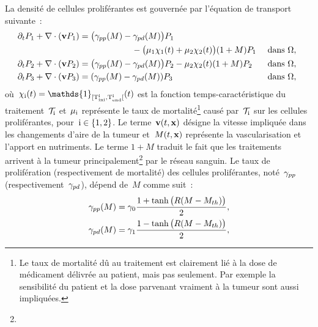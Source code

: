 \documentclass[main.tex]{subfiles}
\begin{document}
La densité de cellules proliférantes est gouvernée par l'équation de transport suivante~:
\begin{align}
\mkern-8mu \partial_t P_1 & + \dive(\vit P_1) = \big(\gammapp(M)- \gammapd(M)\big)P_1 \nonumber \\
 & \hspace{4cm}  - \big(\muI \chiI (t)+\muS \chiS(t) \big)(1+M)P_1 & \textrm{ dans } \Omega, \label{eq_P1}\\
\mkern-8mu \partial_t P_2 &+ \dive(\vit P_2) = \big(\gammapp(M)- \gammapd(M)\big)P_2 - \muS \chiS(t) (1+M)P_2 & \textrm{ dans }  \Omega, \label{eq_P2}\\
\mkern-8mu \partial_t P_3 &+ \dive(\vit P_3) = (\gammapp(M) - \gammapd(M))P_3 & \textrm{ dans }  \Omega, \label{eq_P3}
\end{align}%
où~$\chii(t)=\mathds{1}_{[\Tini{i},\rm \Tend{i}[}(t)$ est la fonction temps-caractéristique du 
traitement~$\mathcal{T}_{\rm i}$ et~$\mu_{\rm i}$ représente le taux de mortalité\footnote{Le taux de mortalité dû au traitement est clairement lié à la dose de médicament délivrée au patient, mais pas seulement. Par exemple la sensibilité du patient et la dose parvenant vraiment à la tumeur sont aussi impliquées.} causé par~$\mathcal{T}_{\rm i}$ sur les cellules proliférantes, pour~$\rm i\in\{1,2\}$. 
Le terme~$\mathbf{v} (t,\mathbf{x})$ désigne la vitesse impliquée dans les changements d'aire de la tumeur et~$M(t,\mathbf{x})$ représente la vascularisation et l'apport en nutriments. 
Le terme $1+M$ traduit le fait que les traitements arrivent à la tumeur principalement\footnote{} par le réseau sanguin. 
Le taux de prolifération (respectivement de mortalité) des cellules proliférantes, noté~$\gamma_{pp}$ (respectivement~$\gamma_{pd}$), dépend de~$M$ comme suit~:
\begin{align}
\gamma_{pp}(M) &=\gamma_0 \frac{1+\tanh\big(R(M-M_{th})\big)}{2}, \label{eq_gammapp}\\
\gamma_{pd}(M) &=\gamma_1 \frac{1-\tanh\big(R(M-M_{th})\big)}{2}, \label{eq_gammapd}
\end{align}
\end{document}
